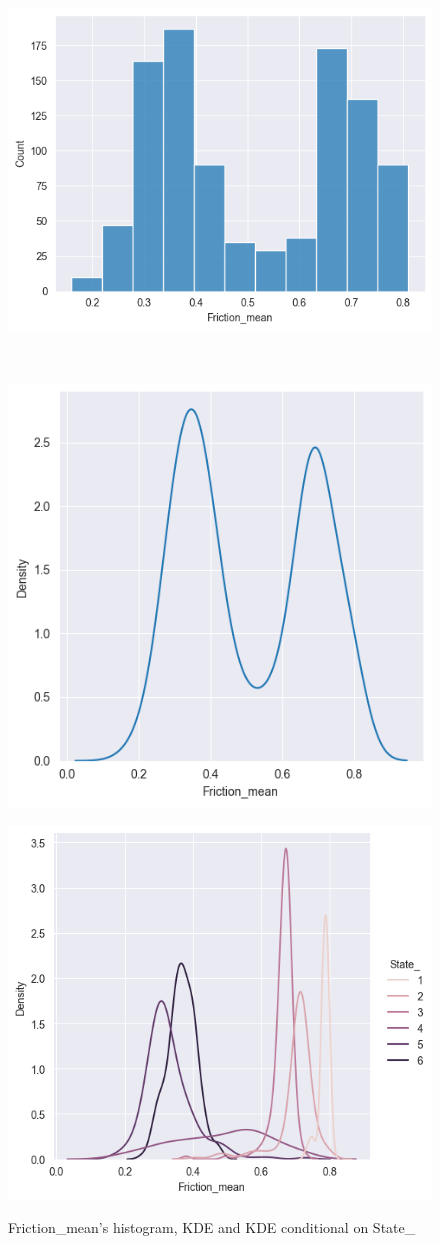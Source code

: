 \documentclass[12pt, bachelor, substylefile = algo_title.rtx]{disser}
\theoremstyle{definition}
\begin{document}
\begin{figure}[!h]
\centering
   \begin{minipage}{0.48\textwidth}
     \includegraphics[width=.7\linewidth]{friction_hist}
	\label{fig: 1a}
   \end{minipage}\\
   \begin{minipage}{0.48\textwidth}
     \centering
     \includegraphics[width=.7\linewidth]{friction_kde}
	\label{fig: 1b}
   \end{minipage}\hfill
\begin{minipage}{0.48\textwidth}
     \includegraphics[width=.7\linewidth]{friction_kde1}
	\label{fig: 1c}
   \end{minipage}
\caption{Friction\_mean's histogram, KDE and KDE conditional on State\_}
\label{fig: 1}
\end{figure}
\end{document}
